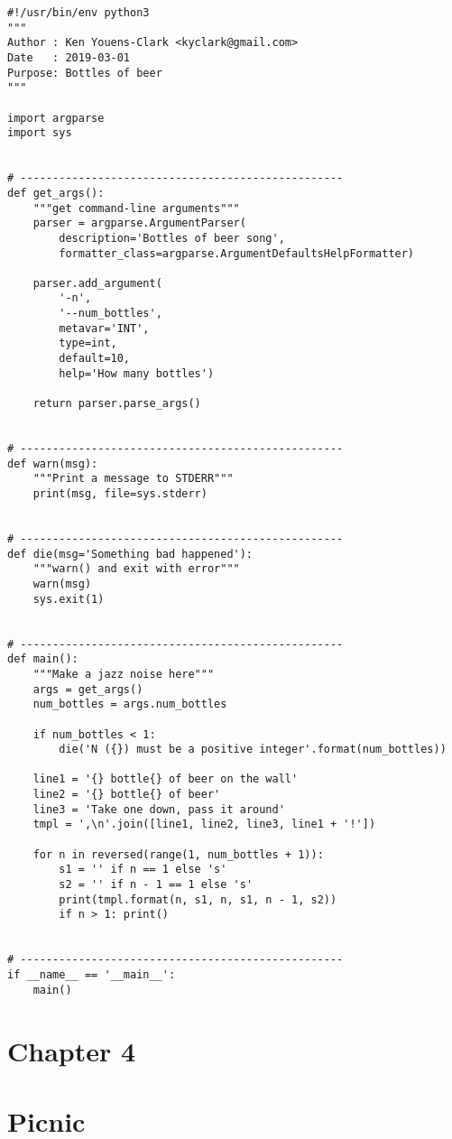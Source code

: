 \documentclass[]{article}
\begin{document}
\begin{verbatim}
#!/usr/bin/env python3
"""
Author : Ken Youens-Clark <kyclark@gmail.com>
Date   : 2019-03-01
Purpose: Bottles of beer
"""

import argparse
import sys


# --------------------------------------------------
def get_args():
    """get command-line arguments"""
    parser = argparse.ArgumentParser(
        description='Bottles of beer song',
        formatter_class=argparse.ArgumentDefaultsHelpFormatter)

    parser.add_argument(
        '-n',
        '--num_bottles',
        metavar='INT',
        type=int,
        default=10,
        help='How many bottles')

    return parser.parse_args()


# --------------------------------------------------
def warn(msg):
    """Print a message to STDERR"""
    print(msg, file=sys.stderr)


# --------------------------------------------------
def die(msg='Something bad happened'):
    """warn() and exit with error"""
    warn(msg)
    sys.exit(1)


# --------------------------------------------------
def main():
    """Make a jazz noise here"""
    args = get_args()
    num_bottles = args.num_bottles

    if num_bottles < 1:
        die('N ({}) must be a positive integer'.format(num_bottles))

    line1 = '{} bottle{} of beer on the wall'
    line2 = '{} bottle{} of beer'
    line3 = 'Take one down, pass it around'
    tmpl = ',\n'.join([line1, line2, line3, line1 + '!'])

    for n in reversed(range(1, num_bottles + 1)):
        s1 = '' if n == 1 else 's'
        s2 = '' if n - 1 == 1 else 's'
        print(tmpl.format(n, s1, n, s1, n - 1, s2))
        if n > 1: print()


# --------------------------------------------------
if __name__ == '__main__':
    main()
\end{verbatim}

\pagebreak

\hypertarget{chapter-4}{%
\section{Chapter 4}\label{chapter-4}}

\hypertarget{picnic}{%
\section{Picnic}\label{picnic}}
\end{document}
